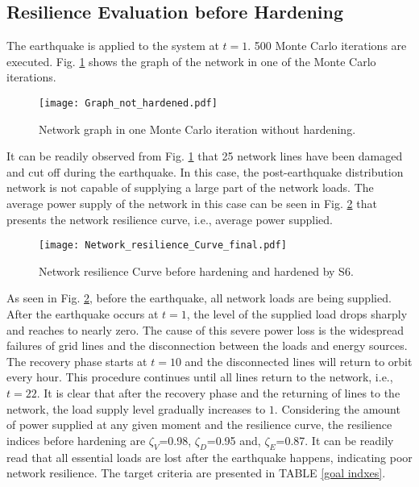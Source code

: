 \documentclass[conference]{IEEEtran}
\begin{document}
\subsection{Resilience Evaluation before Hardening}
The earthquake is applied to the system at $t=1$. 500 Monte Carlo iterations are executed. Fig. \ref{Graph of the network in one of the Monte Carlo iterations without hardening} shows the graph of the network in one of the Monte Carlo iterations. \begin{figure}
    \centering
    \texttt{[image: Graph\_not\_hardened.pdf]}
    \caption{Network graph in one Monte Carlo iteration without hardening.}
    \label{Graph of the network in one of the Monte Carlo iterations without hardening}
\end{figure}
 It can be readily observed from Fig. \ref{Graph of the network in one of the Monte Carlo iterations without hardening} that 25 network lines have been damaged and cut off during the earthquake. In this case, the post-earthquake distribution network is not capable of supplying a large part of the network loads. The average power supply of the network in this case can be seen in Fig. \ref{Resilience Curve of the network before Hardening and hardened by S6} that presents the network resilience curve, i.e., average power supplied.\begin{figure}
    \centering
    \texttt{[image: Network\_resilience\_Curve\_final.pdf]}
    \caption{Network resilience Curve before hardening and hardened by S6.}
    \label{Resilience Curve of the network before Hardening and hardened by S6}
\end{figure}
As seen in Fig. \ref{Resilience Curve of the network before Hardening and hardened by S6}, before the earthquake, all network loads are being supplied. After the earthquake occurs at $t=1$, the level of the supplied load drops sharply and reaches to nearly zero. The cause of this severe power loss is the widespread failures of grid lines and the disconnection between the loads and energy sources. The recovery phase starts at $t=10$ and the disconnected lines will return to orbit every hour. This procedure continues until all lines return to the network, i.e., $t=22$. It is clear that after the recovery phase and the returning of lines to the network, the load supply level gradually increases to $1$. Considering the amount of power supplied at any given moment and the resilience curve, the resilience indices before hardening are $\zeta_V$=0.98, $\zeta_D$=0.95 and, $\zeta_E$=0.87.
It can be readily read that all essential loads are lost after the earthquake happens, indicating poor network resilience. The target criteria are presented in TABLE \ref{goal indxes}.
\end{document}
